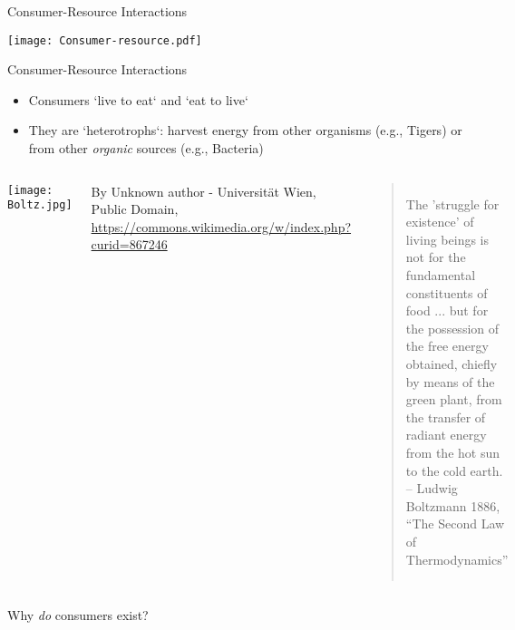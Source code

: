 \begin{frame}{Consumer-Resource Interactions}

\begin{center}
  \texttt{[image: Consumer-resource.pdf]}  
\end{center}

\end{frame}

\begin{frame}{Consumer-Resource Interactions}

\begin{itemize}\itemsep6pt
  \item Consumers `live to eat` and `eat to live`
  \item They are `heterotrophs`: harvest energy from other organisms (e.g., Tigers) or from other {\it organic} sources (e.g., Bacteria) 
\end{itemize}

\pause
\begin{columns}[c]
  \centering
    \vspace*{\fill} \texttt{[image: Boltz.jpg]} 
    {\tiny By Unknown author - Universit\"{a}t Wien, Public Domain, \url{https://commons.wikimedia.org/w/index.php?curid=867246}\par}\vspace*{\fill}  
  \centering
  \vspace*{\fill} 
  \begin{quote} 
  The 'struggle for existence' of living beings is not for the fundamental constituents of food ... but for the possession of the free energy obtained, chiefly by means of the green plant, from the transfer of radiant energy from the hot sun to the cold earth. \\
  \centering
    \hfill -- {\small Ludwig Boltzmann 1886, ``The Second Law of Thermodynamics''}
\end{quote}
\vspace*{\fill}
\end{columns}

\end{frame}


\begin{frame}{Why {\it do} consumers exist?}


\end{frame}

